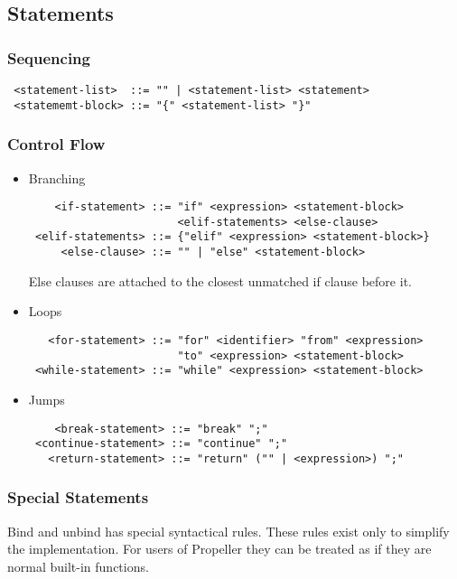 \subsection{Statements}

\subsubsection{Sequencing}

\begin{verbatim}
 <statement-list>  ::= "" | <statement-list> <statement>
 <statememt-block> ::= "{" <statement-list> "}"
\end{verbatim}

\subsubsection{Control Flow}

\begin{itemize}
\item Branching
\begin{verbatim}
    <if-statement> ::= "if" <expression> <statement-block>
                       <elif-statements> <else-clause>
 <elif-statements> ::= {"elif" <expression> <statement-block>}
     <else-clause> ::= "" | "else" <statement-block>
\end{verbatim}
Else clauses are attached to the closest unmatched if clause before it.

\item Loops
\begin{verbatim}
   <for-statement> ::= "for" <identifier> "from" <expression>
                       "to" <expression> <statement-block>
 <while-statement> ::= "while" <expression> <statement-block>
\end{verbatim}

\item Jumps
\begin{verbatim}
    <break-statement> ::= "break" ";"
 <continue-statement> ::= "continue" ";"
   <return-statement> ::= "return" ("" | <expression>) ";"
\end{verbatim}
\end{itemize}

\subsubsection{Special Statements}

Bind and unbind has special syntactical rules. These rules exist only to simplify the
implementation. For users of Propeller they can be treated as if they are normal
built-in functions.

